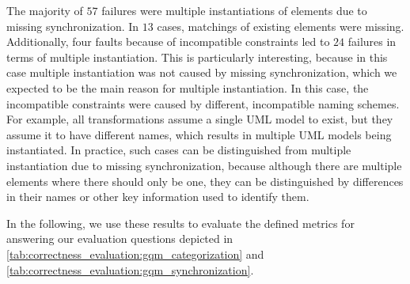 The majority of $57$ failures were multiple instantiations of elements due to missing synchronization. In $13$ cases, matchings of existing elements were missing.
Additionally, four faults because of incompatible constraints led to $24$ failures in terms of multiple instantiation.
This is particularly interesting, because in this case multiple instantiation was not caused by missing synchronization, which we expected to be the main reason for multiple instantiation.
In this case, the incompatible constraints were caused by different, incompatible naming schemes.
For example, all transformations assume a single \gls{UML} model to exist, but they assume it to have different names, which results in multiple \gls{UML} models being instantiated.
In practice, such cases can be distinguished from multiple instantiation due to missing synchronization, because although there are multiple elements where there should only be one, they can be distinguished by differences in their names or other key information used to identify them.

In the following, we use these results to evaluate the defined metrics for answering our evaluation questions depicted in \autoref{tab:correctness_evaluation:gqm_categorization} and \autoref{tab:correctness_evaluation:gqm_synchronization}.






